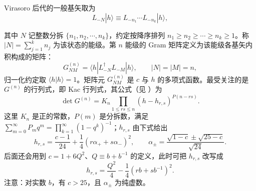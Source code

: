 Virasoro 后代的一般基矢取为
\begin{equation}
  \label{eq:2-14}
  L_{-N}|h\rangle \equiv L_{-n_1}\cdots L_{-n_k}|h\rangle,
\end{equation}

其中 $N$ 记整数分拆 $\{n_1,n_2,\cdots,n_k\}$，约定按降序排列 $n_1\ge n_2\ge\cdots\ge n_k\ge 1$。称 $|N|=\sum_{j=1}^{k}n_j$ 为该状态的能级。第 $n$ 能级的 Gram 矩阵定义为该能级各基矢内积构成的矩阵：
\begin{equation}
  \label{eq:2-15}
  G^{(n)}_{NM} = \langle h|L_{-N}^{\dagger}L_{-M}|h\rangle,\qquad |N|=|M|=n,
\end{equation}
归一化约定取 $\langle h|h\rangle=1$。矩阵元 $G^{(n)}_{NM}$ 是 $c$ 与 $h$ 的多项式函数。最受关注的是 $G^{(n)}$ 的行列式，即 Kac 行列式，其公式（见 \cite{r2,r3}）为
\begin{equation}
  \label{eq:2-16}
  \det G^{(n)} = K_n\prod_{1\le rs\le n}(h-h_{r,s})^{P(n-rs)}.
\end{equation}
这里 $K_n$ 是正的常数，$P(m)$ 是分拆数，满足 $\sum_{m=0}^{\infty}P_m q^m=\prod_{k=1}^{\infty}(1-q^k)^{-1}$；$h_{r,s}$ 由下式给出
\begin{equation}
  \label{eq:2-17}
  h_{r,s} = \frac{c-1}{24}+\frac{1}{4}(r\alpha_+ + s\alpha_-)^2,\qquad
  \alpha_\pm = \frac{\sqrt{1-c}\pm\sqrt{25-c}}{\sqrt{24}}.
\end{equation}
后面还会用到 $c=1+6Q^2$、$Q\equiv b+b^{-1}$ 的定义，此时可把 $h_{r,s}$ 改写成
\begin{equation}
  \label{eq:2-18}
  h_{r,s} = \frac{Q^2}{4}-\frac{1}{4}(rb+sb^{-1})^2.
\end{equation}
注意：对实数 $b$，有 $c>25$，且 $\alpha_\pm$ 为纯虚数。

